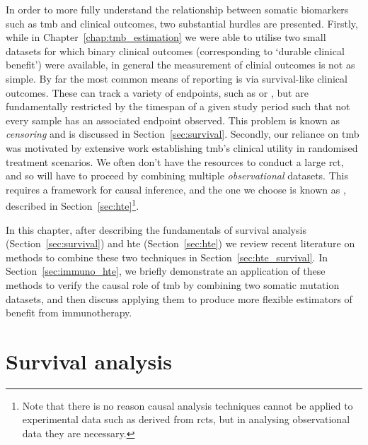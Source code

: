 \documentclass[../thesis.tex]{subfiles}
\begin{document}
In order to more fully understand the relationship between somatic biomarkers such as \gls{tmb} and clinical outcomes, two substantial hurdles are presented. Firstly, while in Chapter~\ref{chap:tmb_estimation} we were able to utilise two small datasets for which binary clinical outcomes (corresponding to `durable clinical benefit') were available, in general the measurement of clinial outcomes is not as simple. By far the most common means of reporting is via survival-like clinical outcomes. These can track a variety of endpoints, such as  or , but are fundamentally restricted by the timespan of a given study period such that not every sample has an associated endpoint observed. This problem is known as \textit{censoring} and is discussed in Section~\ref{sec:survival}. Secondly, our reliance on \gls{tmb} was motivated by extensive work establishing \gls{tmb}'s clinical utility in randomised treatment scenarios. We often don't have the resources to conduct a large \gls{rct}, and so will have to proceed by combining multiple \emph{observational} datasets. This requires a framework for causal inference, and the one we choose is known as , described in Section~\ref{sec:hte}\footnote{Note that there is no reason causal analysis techniques cannot be applied to experimental data such as derived from \glspl{rct}, but in analysing observational data they are necessary.}.

In this chapter, after describing the fundamentals of survival analysis (Section~\ref{sec:survival}) and \gls{hte} (Section~\ref{sec:hte}) we review recent literature on methods to combine these two techniques in Section~\ref{sec:hte_survival}. In Section~\ref{sec:immuno_hte}, we briefly demonstrate an application of these methods to verify the causal role of \gls{tmb} by combining two somatic mutation datasets, and then discuss applying them to produce more flexible estimators of benefit from immunotherapy.

\section{Survival analysis \label{sec:survival}}
\end{document}
